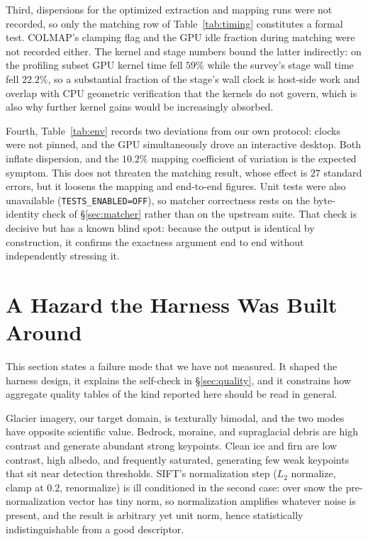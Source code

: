 \documentclass[conference]{IEEEtran}
\newcommand{\opt}[1]{\texttt{#1}}
\begin{document}
Third, dispersions for the optimized extraction and mapping runs were not
recorded, so only the matching row of Table~\ref{tab:timing} constitutes a
formal test. COLMAP's clamping flag and the GPU idle fraction during matching
were not recorded either. The kernel and stage numbers bound the latter
indirectly: on the profiling subset GPU kernel time fell $59\%$ while the
survey's stage wall time fell $22.2\%$, so a substantial fraction of the
stage's wall clock is host-side work and overlap with CPU geometric
verification that the kernels do not govern, which is also why further kernel
gains would be increasingly absorbed.

Fourth, Table~\ref{tab:env} records two deviations from our own protocol: clocks
were not pinned, and the GPU simultaneously drove an interactive desktop. Both
inflate dispersion, and the $10.2\%$ mapping coefficient of variation is the
expected symptom. This does not threaten the matching result, whose effect is
$27$ standard errors, but it loosens the mapping and end-to-end figures. Unit
tests were also unavailable (\opt{TESTS\_ENABLED=OFF}), so matcher correctness
rests on the byte-identity check of \S\ref{sec:matcher} rather than on the
upstream suite. That check is decisive but has a known blind spot: because the
output is identical by construction, it confirms the exactness argument end to
end without independently stressing it.


\section{A Hazard the Harness Was Built Around}
\label{sec:trap}

This section states a failure mode that we have not measured. It shaped the
harness design, it explains the self-check in \S\ref{sec:quality}, and it
constrains how aggregate quality tables of the kind reported here should be read
in general.

Glacier imagery, our target domain, is texturally bimodal, and the two modes
have opposite scientific value. Bedrock, moraine, and supraglacial debris are
high contrast and generate abundant strong keypoints. Clean ice and firn are low
contrast, high albedo, and frequently saturated, generating few weak keypoints
that sit near detection thresholds. SIFT's normalization step ($L_2$ normalize,
clamp at $0.2$, renormalize) is ill conditioned in the second case: over snow the
pre-normalization vector has tiny norm, so normalization amplifies whatever noise
is present, and the result is arbitrary yet unit norm, hence statistically
indistinguishable from a good descriptor.
\end{document}
